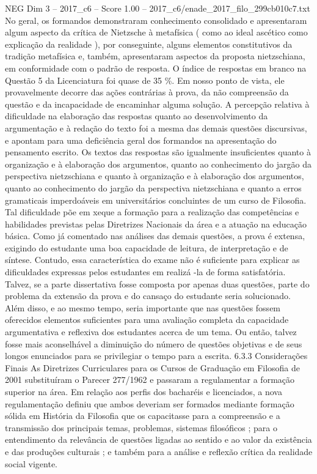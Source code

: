 \begin{textsample}{NEG Dim 3 – 2017\_c6 – Score 1.00 – 2017\_c6/enade\_2017\_filo\_299cb010c7.txt}
No geral, os formandos demonstraram conhecimento consolidado e apresentaram algum aspecto da crítica de Nietzsche à metafísica ( como ao ideal ascético como explicação da realidade ), por conseguinte, alguns elementos constitutivos da tradição metafísica e, também, apresentaram aspectos da proposta nietzschiana, em conformidade com o padrão de resposta.
O índice de respostas em branco na Questão 5 da Licenciatura foi quase de 35 \%.
Em nosso ponto de vista, ele provavelmente decorre das ações contrárias à prova, da não compreensão da questão e da incapacidade de encaminhar alguma solução.
A percepção relativa à dificuldade na elaboração das respostas quanto ao desenvolvimento da argumentação e à redação do texto foi a mesma das demais questões discursivas, e apontam para uma deficiência geral dos formandos na apresentação do pensamento escrito.
Os textos das respostas são igualmente insuficientes quanto à organização e à elaboração dos argumentos, quanto ao conhecimento do jargão da perspectiva nietzschiana e quanto à organização e à elaboração dos argumentos, quanto ao conhecimento do jargão da perspectiva nietzschiana e quanto a erros gramaticais imperdoáveis em universitários concluintes de um curso de Filosofia.
Tal dificuldade põe em xeque a formação para a realização das competências e habilidades previstas pelas Diretrizes Nacionais da área e a atuação na educação básica.
Como já comentado nas análises das demais questões, a prova é extensa, exigindo do estudante uma boa capacidade de leitura, de interpretação e de síntese.
Contudo, essa característica do exame não é suficiente para explicar as dificuldades expressas pelos estudantes em realizá -la de forma satisfatória.
Talvez, se a parte dissertativa fosse composta por apenas duas questões, parte do problema da extensão da prova e do cansaço do estudante seria solucionado.
Além disso, e ao mesmo tempo, seria importante que nas questões fossem oferecidos elementos suficientes para uma avaliação completa da capacidade argumentativa e reflexiva dos estudantes acerca de um tema.
Ou então, talvez fosse mais aconselhável a diminuição do número de questões objetivas e de seus longos enunciados para se privilegiar o tempo para a escrita. 6.3.3 Considerações Finais As Diretrizes Curriculares para os Cursos de Graduação em Filosofia de 2001 substituíram o Parecer 277/1962 e passaram a regulamentar a formação superior na área.
Em relação aos perfis dos bacharéis e licenciados, a nova regulamentação definiu que ambos deveriam ser formados mediante formação sólida em História da Filosofia que os capacitasse para a compreensão e a transmissão dos principais temas, problemas, sistemas filosóficos ; para o entendimento da relevância de questões ligadas ao sentido e ao valor da existência e das produções culturais ; e também para a análise e reflexão crítica da realidade social vigente.

\end{textsample}
